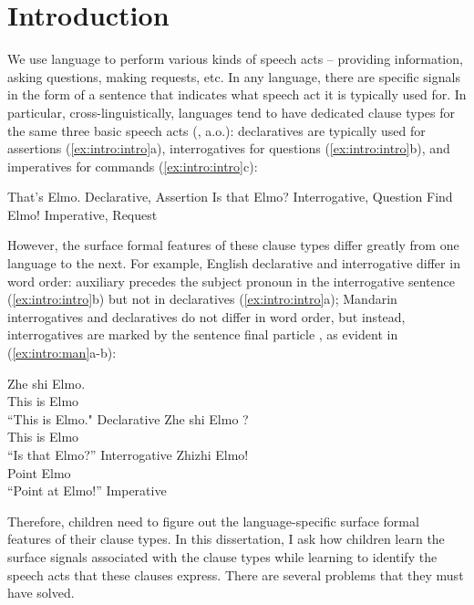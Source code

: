 \chapter{Introduction}
\label{chap:introduction}

We use language to perform various kinds of speech acts -- providing information, asking questions, making requests, etc. In any language, there are specific signals in the form of a sentence that indicates what speech act it is typically used for. In particular, cross-linguistically, languages tend to have dedicated clause types for the same three basic speech acts (\citealt{sz1985speechact, konig2007, aikhenvald2016, portner2018}, a.o.): declaratives are typically used for assertions (\ref{ex:intro:intro}a), interrogatives for questions (\ref{ex:intro:intro}b), and imperatives for commands (\ref{ex:intro:intro}c):

\bxl
That's Elmo. \hfill Declarative, Assertion
\ex Is that Elmo? \hfill Interrogative, Question
\ex Find Elmo! \hfill Imperative, Request
\exl
\eex


However, the surface formal features of these clause types differ greatly from one language to the next. For example, English declarative and interrogative differ in word order: auxiliary  precedes the subject pronoun in the interrogative sentence (\ref{ex:intro:intro}b) but not in declaratives (\ref{ex:intro:intro}a); Mandarin interrogatives and declaratives do not differ in word order, but instead, interrogatives are marked by the sentence final particle , as evident in (\ref{ex:intro:man}a-b): 

\bxl
\gll Zhe shi Elmo.\\
This is Elmo\\
\trans ``This is Elmo." \hfill Declarative
\ex 
\gll Zhe shi Elmo ?\\
This is Elmo \Sfp\\
\trans ``Is that Elmo?'' \hfill Interrogative
\ex 
\gll Zhizhi Elmo!\\
Point Elmo\\
\trans ``Point at Elmo!'' \hfill Imperative
\exl
\eex

Therefore, children need to figure out the language-specific surface formal features of their clause types. In this dissertation, I ask how children learn the surface signals associated with the clause types while learning to identify the speech acts that these clauses express. There are several problems that they must have solved.

